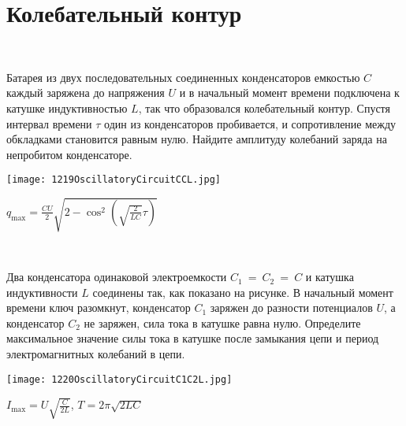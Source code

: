 \section{Колебательный контур}

\begin{ex}
\hspace{0pt} \\
\begin{minipage}{.65\textwidth}
Батарея из двух последовательных соединенных конденсаторов емкостью $C$ каждый заряжена до напряжения $U$ и в начальный момент времени подключена к катушке индуктивностью $L$, так что образовался колебательный контур. 
Спустя интервал времени $\tau$ один из конденсаторов пробивается, и сопротивление между обкладками становится равным нулю. 
Найдите амплитуду колебаний заряда на непробитом конденсаторе.
\end{minipage}
\begin{minipage}{.35\textwidth}
\centering
\texttt{[image: 1219OscillatoryCircuitCCL.jpg]}
\end{minipage}
\begin{ans}
$q_{\max} = \frac{CU}{2}\sqrt{2-\cos^2 \left( \sqrt{\frac{2}{LC}} \tau \right)}$
\end{ans}
\end{ex}

\begin{ex}
\hspace{0pt} \\
\begin{minipage}{.65\textwidth}
 Два конденсатора одинаковой электроемкости $C_1~=~C_2~=~C$ и катушка индуктивности $L$ соединены так, как показано на рисунке. 
В начальный момент времени ключ разомкнут, конденсатор $C_1$ заряжен до разности потенциалов $U$, а конденсатор $C_2$ не заряжен, 
сила тока в катушке равна нулю. Определите максимальное значение силы тока в катушке после замыкания цепи и период электромагнитных колебаний в цепи. 
\end{minipage}
\begin{minipage}{.35\textwidth}
\centering
\texttt{[image: 1220OscillatoryCircuitC1C2L.jpg]}
\end{minipage}
\begin{ans}
$I_{\max} = U \sqrt{\frac{C}{2L}}$, $T=2 \pi \sqrt{2LC}$
\end{ans}
\end{ex}

